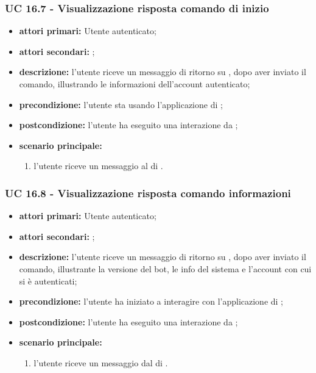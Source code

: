 	\subsubsection{UC 16.7 - Visualizzazione risposta comando di inizio }

	\begin{itemize}
			\item \textbf{attori primari:} Utente autenticato;
			\item \textbf{attori secondari:} ;
			\item \textbf{descrizione:} l'utente riceve un messaggio di ritorno su , dopo aver inviato il comando, illustrando le informazioni dell'account autenticato;
			\item \textbf{precondizione:} l'utente sta usando l'applicazione di ;
			\item \textbf{postcondizione:} l'utente ha eseguito una interazione da ;
			\item \textbf{scenario principale:}
			\begin{enumerate}
				\item l'utente riceve un messaggio al  di .
			\end{enumerate}
		\end{itemize}

	\subsubsection{UC 16.8 - Visualizzazione risposta comando informazioni}

	\begin{itemize}
			\item \textbf{attori primari:} Utente autenticato;
			\item \textbf{attori secondari:} ;
			\item \textbf{descrizione:} l'utente riceve un messaggio di ritorno su , dopo aver inviato il comando, illustrante la versione del bot, le info del sistema e l'account con cui si è autenticati;
			\item \textbf{precondizione:} l'utente ha iniziato a interagire con l'applicazione di ;
			\item \textbf{postcondizione:} l'utente ha eseguito una interazione da ;
			\item \textbf{scenario principale:}
			\begin{enumerate}
				\item l'utente riceve un messaggio dal  di .
			\end{enumerate}
		\end{itemize}	

